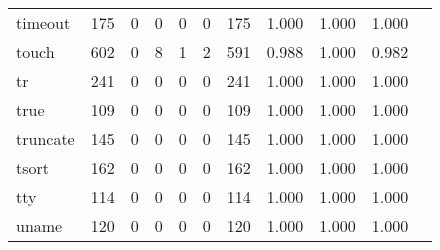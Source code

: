 \begin{longtable}{lp{1.10cm}p{1.10cm}p{1.10cm}p{1.10cm}p{1.10cm}p{1.10cm}p{1.10cm}p{1.10cm}p{1.10cm}p{1.10cm}}
timeout   &                    175 &                                  0 &                                 0 &                                0 &                                 0 &                             175 &                             1.000 &                                 1.000 &                               1.000 \\
touch     &                    602 &                                  0 &                                 8 &                                1 &                                 2 &                             591 &                             0.988 &                                 1.000 &                               0.982 \\
tr        &                    241 &                                  0 &                                 0 &                                0 &                                 0 &                             241 &                             1.000 &                                 1.000 &                               1.000 \\
true      &                    109 &                                  0 &                                 0 &                                0 &                                 0 &                             109 &                             1.000 &                                 1.000 &                               1.000 \\
truncate  &                    145 &                                  0 &                                 0 &                                0 &                                 0 &                             145 &                             1.000 &                                 1.000 &                               1.000 \\
tsort     &                    162 &                                  0 &                                 0 &                                0 &                                 0 &                             162 &                             1.000 &                                 1.000 &                               1.000 \\
tty       &                    114 &                                  0 &                                 0 &                                0 &                                 0 &                             114 &                             1.000 &                                 1.000 &                               1.000 \\
uname     &                    120 &                                  0 &                                 0 &                                0 &                                 0 &                             120 &                             1.000 &                                 1.000 &                               1.000 \\

\end{longtable}

